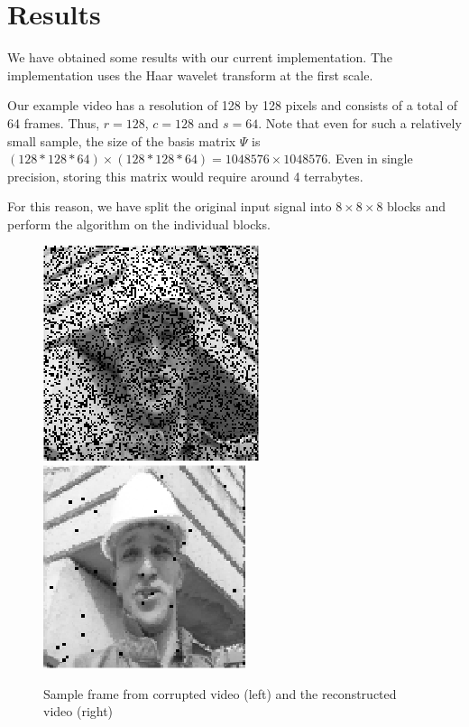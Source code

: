 \chapter{Results}
We have obtained some results with our current implementation.
The implementation uses the Haar wavelet transform at the first scale.

Our example video has a resolution of 128 by 128 pixels and consists of a total of 64 frames.
Thus, $r = 128$, $c = 128$ and $s = 64$.
Note that even for such a relatively small sample, the size of the basis matrix $\Psi$ is $(128*128*64)\times(128*128*64) = 1048576\times 1048576$.
Even in single precision, storing this matrix would require around 4 terrabytes.

For this reason, we have split the original input signal into $8\times 8\times 8$ blocks and perform the algorithm on the individual blocks.
\begin{figure}
\label{fig:foreman}
\includegraphics{Images/corr.png}
\includegraphics{Images/rec.png}
\caption{Sample frame from corrupted video (left) and the reconstructed video (right)}
\end{figure}

